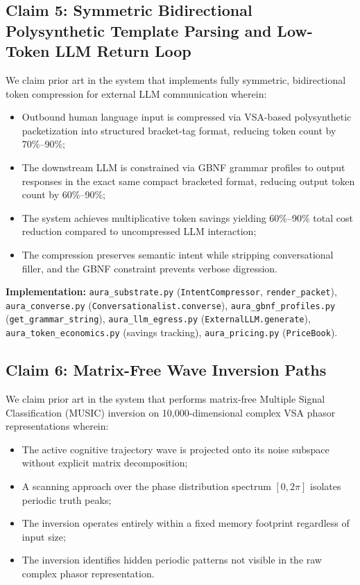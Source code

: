 \documentclass[11pt]{article}
\begin{document}
\subsection{Claim 5: Symmetric Bidirectional Polysynthetic Template Parsing and Low-Token LLM Return Loop}

We claim prior art in the system that implements fully symmetric, bidirectional token compression for external LLM communication wherein:
\begin{itemize}
    \item Outbound human language input is compressed via VSA-based polysynthetic packetization into structured bracket-tag format, reducing token count by 70\%--90\%;
    \item The downstream LLM is constrained via GBNF grammar profiles to output responses in the exact same compact bracketed format, reducing output token count by 60\%--90\%;
    \item The system achieves multiplicative token savings yielding 60\%--90\% total cost reduction compared to uncompressed LLM interaction;
    \item The compression preserves semantic intent while stripping conversational filler, and the GBNF constraint prevents verbose digression.
\end{itemize}

\textbf{Implementation:} \texttt{aura\_substrate.py} (\texttt{IntentCompressor}, \texttt{render\_packet}), \texttt{aura\_converse.py} (\texttt{Conversationalist.converse}), \texttt{aura\_gbnf\_profiles.py} (\texttt{get\_grammar\_string}), \texttt{aura\_llm\_egress.py} (\texttt{ExternalLLM.generate}), \texttt{aura\_token\_economics.py} (savings tracking), \texttt{aura\_pricing.py} (\texttt{PriceBook}).

\subsection{Claim 6: Matrix-Free Wave Inversion Paths}

We claim prior art in the system that performs matrix-free Multiple Signal Classification (MUSIC) inversion on 10,000-dimensional complex VSA phasor representations wherein:
\begin{itemize}
    \item The active cognitive trajectory wave is projected onto its noise subspace without explicit matrix decomposition;
    \item A scanning approach over the phase distribution spectrum $[0, 2\pi]$ isolates periodic truth peaks;
    \item The inversion operates entirely within a fixed memory footprint regardless of input size;
    \item The inversion identifies hidden periodic patterns not visible in the raw complex phasor representation.
\end{itemize}
\end{document}
